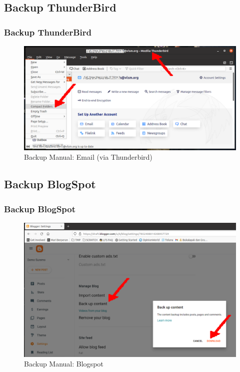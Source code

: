 \documentclass[xcolor=table, notheorems, hyperref={pdfpagelabels=false}]{beamer}
\begin{document}
\begin{frame}[fragile]
\section{Backup ThunderBird}
\frametitle{Backup ThunderBird}
\begin{figure}
\includegraphics[width=0.91\linewidth]{ThunderBird}
\caption{Backup Manual: Email (via Thunderbird)}
\end{figure}
\end{frame}

\begin{frame}[fragile]
\section{Backup BlogSpot}
\frametitle{Backup BlogSpot}
\begin{figure}
\includegraphics[width=0.91\linewidth]{BlogSpot}
\caption{Backup Manual: Blogspot}
\end{figure}
\end{frame}
\end{document}
